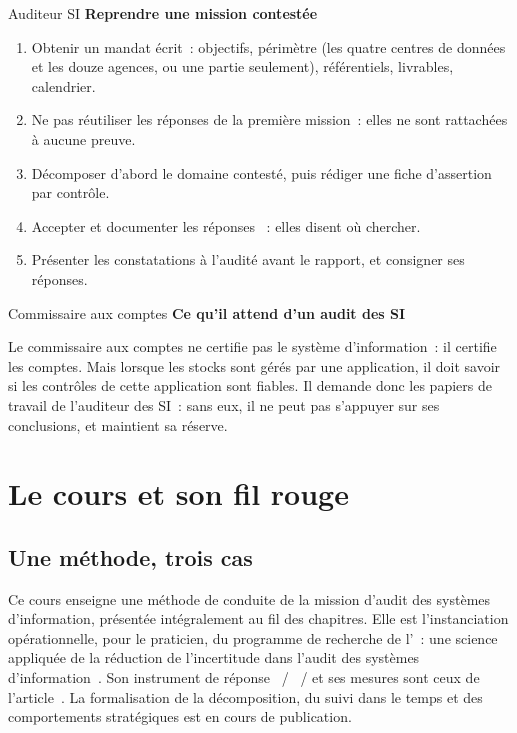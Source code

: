 \begin{boxmetier}{Auditeur SI}
\textbf{Reprendre une mission contestée}
\begin{enumerate}
    \item Obtenir un mandat écrit~: objectifs, périmètre (les quatre centres
          de données et les douze agences, ou une partie seulement),
          référentiels, livrables, calendrier.
    \item Ne pas réutiliser les réponses de la première mission~: elles ne
          sont rattachées à aucune preuve.
    \item Décomposer d'abord le domaine contesté, puis rédiger une fiche
          d'assertion par contrôle.
    \item Accepter et documenter les réponses \NEK{}~: elles disent où
          chercher.
    \item Présenter les constatations à l'audité avant le rapport, et
          consigner ses réponses.
\end{enumerate}
\end{boxmetier}

\begin{boxmetier}{Commissaire aux comptes}
\textbf{Ce qu'il attend d'un audit des SI}

Le commissaire aux comptes ne certifie pas le système d'information~: il
certifie les comptes. Mais lorsque les stocks sont gérés par une
application, il doit savoir si les contrôles de cette application sont
fiables. Il demande donc les papiers de travail de l'auditeur des SI~: sans
eux, il ne peut pas s'appuyer sur ses conclusions, et maintient sa réserve.
\end{boxmetier}

\section{Le cours et son fil rouge}
\label{sec:pro-cours}

\subsection{Une méthode, trois cas}

Ce cours enseigne une méthode de conduite de la mission d'audit des
systèmes d'information, présentée intégralement au fil des chapitres. Elle
est l'instanciation opérationnelle, pour le praticien, du programme de
recherche de l'~: une science
appliquée de la réduction de l'incertitude dans l'audit des
systèmes d'information~\cite{minka2026auditologie}. Son instrument de
réponse \OUI{}~/ \NON{}~/ \NEK{} et ses mesures sont ceux de
l'article~\cite{minka2026nek}. La formalisation de la décomposition, du
suivi dans le temps et des comportements stratégiques est en cours de
publication.


